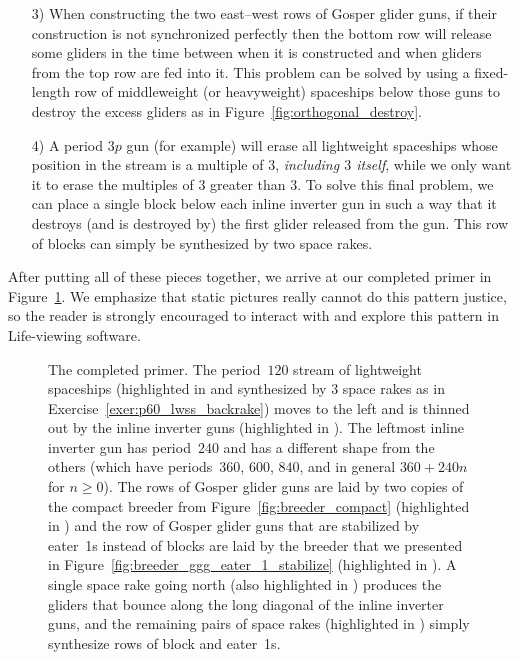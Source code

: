 \begin{enumerate}
	\item[3)] When constructing the two east--west rows of Gosper glider guns, if their construction is not synchronized perfectly then the bottom row will release some gliders in the time between when it is constructed and when gliders from the top row are fed into it. This problem can be solved by using a fixed-length row of middleweight (or heavyweight) spaceships below those guns to destroy the excess gliders as in Figure~\ref{fig:orthogonal_destroy}.\smallskip
	
	\item[4)] A period $3p$ gun (for example) will erase all lightweight spaceships whose position in the stream is a multiple of $3$, \emph{including $3$ itself}, while we only want it to erase the multiples of $3$ greater than $3$. To solve this final problem, we can place a single block below each inline inverter gun in such a way that it destroys (and is destroyed by) the first glider released from the gun. This row of blocks can simply be synthesized by two space rakes.\smallskip
\end{enumerate}

After putting all of these pieces together, we arrive at our completed primer in Figure~\ref{fig:primer}. We emphasize that static pictures really cannot do this pattern justice, so the reader is strongly encouraged to interact with and explore this pattern in Life-viewing software.



\begin{figure}[!htb]
	\centering
	\caption{The completed primer. The period~$120$ stream of lightweight spaceships (highlighted in  and synthesized by $3$ space rakes as in Exercise~\ref{exer:p60_lwss_backrake}) moves to the left and is thinned out by the inline inverter guns (highlighted in ). The leftmost inline inverter gun has period~$240$ and has a different shape from the others (which have periods~$360$, $600$, $840$, and in general $360 + 240n$ for $n \geq 0$). The rows of Gosper glider guns are laid by two copies of the compact breeder from Figure~\ref{fig:breeder_compact} (highlighted in ) and the row of Gosper glider guns that are stabilized by eater~1s instead of blocks are laid by the breeder that we presented in Figure~\ref{fig:breeder_ggg_eater_1_stabilize} (highlighted in ). A single space rake going north (also highlighted in ) produces the gliders that bounce along the long diagonal of the inline inverter guns, and the remaining pairs of space rakes (highlighted in ) simply synthesize rows of block and eater~1s.}
	\label{fig:primer}
\end{figure}


